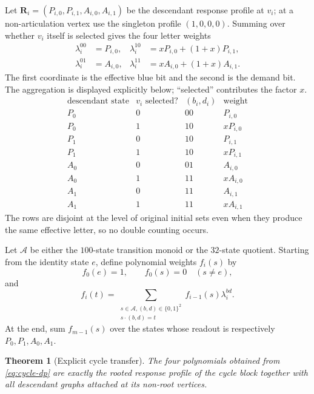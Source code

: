\documentclass[11pt,reqno]{amsart}
\newtheorem{theorem}{Theorem}[section]
\theoremstyle{definition}
\begin{document}
Let $\mathbf R_i=(P_{i,0},P_{i,1},A_{i,0},A_{i,1})$ be the descendant response
profile at $v_i$; at a non-articulation vertex use the singleton profile
$(1,0,0,0)$.  Summing over whether $v_i$ itself is selected gives the four
letter weights
\begin{align}
 \lambda_i^{00}&=P_{i,0},
 &\lambda_i^{10}&=xP_{i,0}+(1+x)P_{i,1},
 \label{eq:cycle-weights-a}\\
 \lambda_i^{01}&=A_{i,0},
 &\lambda_i^{11}&=xA_{i,0}+(1+x)A_{i,1}.
 \label{eq:cycle-weights-b}
\end{align}
The first coordinate is the effective blue bit and the second is the demand
bit.  The aggregation is displayed explicitly below; ``selected'' contributes the
factor $x$.
\[
\begin{array}{c|c|c|c}
\text{descendant state}&v_i\text{ selected?}&(b_i,d_i)&\text{weight}\\
\hline
P_0&0&00&P_{i,0}\\
P_0&1&10&xP_{i,0}\\
P_1&0&10&P_{i,1}\\
P_1&1&10&xP_{i,1}\\
A_0&0&01&A_{i,0}\\
A_0&1&11&xA_{i,0}\\
A_1&0&11&A_{i,1}\\
A_1&1&11&xA_{i,1}
\end{array}
\]
The rows are disjoint at the level of original initial sets even when they
produce the same effective letter, so no double counting occurs.

Let $\mathcal A$ be either the $100$-state transition monoid or the $32$-state
quotient.  Starting from the identity state $e$, define polynomial weights
$f_i(s)$ by
\[
  f_0(e)=1,
  \qquad
  f_0(s)=0\quad(s\ne e),
\]
and
\begin{equation}\label{eq:cycle-dp}
  f_i(t)=
  \sum_{\substack{s\in\mathcal A,
                   (b,d)\in\{0,1\}^2\\
                   s\cdot(b,d)=t}}
  f_{i-1}(s)\lambda_i^{bd}.
\end{equation}
At the end, sum $f_{m-1}(s)$ over the states whose readout is respectively
$P_0,P_1,A_0,A_1$.

\begin{theorem}[Explicit cycle transfer]\label{thm:cycle-transfer}
The four polynomials obtained from \eqref{eq:cycle-dp} are exactly the rooted
response profile of the cycle block together with all descendant graphs
attached at its non-root vertices.
\end{theorem}
\end{document}
